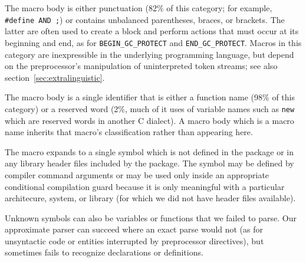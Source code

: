 \begin{description}
{{%
\item[Syntactic]  The macro body is either punctuation (82\% of this
  category; for example, {\tt \#define AND ;}) or contains unbalanced
  parentheses, braces, or brackets.  The latter are often used to create a
  block and perform actions that must occur at its beginning and end, as
  for \verb|BEGIN_GC_PROTECT| and \verb|END_GC_PROTECT|.
  Macros in this category are inexpressible in the underlying programming
  language, but depend on the preprocessor's manipulation of uninterpreted
  token streams; see also section~\ref{sec:extralinguistic}.


\item[Symbol]
  The macro body is a single identifier that is either a function name
  (98\% of this category) or a reserved word (2\%, much of it uses of
  variable names such as {\tt new} which are reserved words in another
  C dialect).  A macro body which is a macro name inherits that macro's
  classification rather than appearing here.


\item[Unknown symbol]
  The macro expands to a single symbol which is not defined in the package
  or in any library header files included by the package.  The symbol may
  be defined by compiler command arguments or may be used only inside an
  appropriate conditional compilation guard because it is only meaningful
  with a particular architecure, system, or library (for which we did not
  have header files available).
  
  Unknown symbols can also be variables or functions that we failed to
  parse.  Our approximate parser can succeed where an exact parse would not
  (as for unsyntactic code or entities interrupted by preprocessor
  directives), but sometimes fails to recognize declarations or
  definitions.


}}
\end{description}
